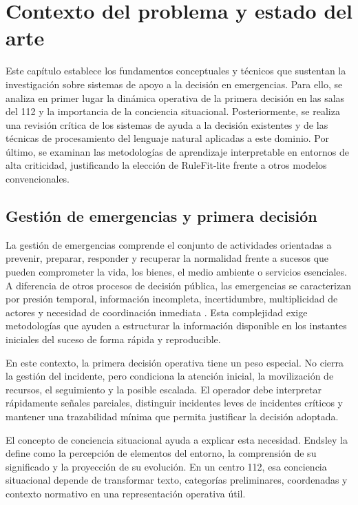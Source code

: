 \chapter{Contexto del problema y estado del arte}
\label{cap:2}

Este capítulo establece los fundamentos conceptuales y técnicos que sustentan la investigación sobre sistemas de apoyo a la decisión en emergencias. Para ello, se analiza en primer lugar la dinámica operativa de la primera decisión en las salas del 112 y la importancia de la conciencia situacional. Posteriormente, se realiza una revisión crítica de los sistemas de ayuda a la decisión existentes y de las técnicas de procesamiento del lenguaje natural aplicadas a este dominio. Por último, se examinan las metodologías de aprendizaje interpretable en entornos de alta criticidad, justificando la elección de RuleFit-lite frente a otros modelos convencionales.

\section{Gestión de emergencias y primera decisión}

La gestión de emergencias comprende el conjunto de actividades orientadas a prevenir, preparar, responder y recuperar la normalidad frente a sucesos que pueden comprometer la vida, los bienes, el medio ambiente o servicios esenciales. A diferencia de otros procesos de decisión pública, las emergencias se caracterizan por presión temporal, información incompleta, incertidumbre, multiplicidad de actores y necesidad de coordinación inmediata \cite{Quarantelli1988,Comfort2007}. Esta complejidad exige metodologías que ayuden a estructurar la información disponible en los instantes iniciales del suceso de forma rápida y reproducible.

En este contexto, la primera decisión operativa tiene un peso especial. No cierra la gestión del incidente, pero condiciona la atención inicial, la movilización de recursos, el seguimiento y la posible escalada. El operador debe interpretar rápidamente señales parciales, distinguir incidentes leves de incidentes críticos y mantener una trazabilidad mínima que permita justificar la decisión adoptada.

El concepto de conciencia situacional ayuda a explicar esta necesidad. Endsley \citeyear{Endsley1995} la define como la percepción de elementos del entorno, la comprensión de su significado y la proyección de su evolución. En un centro 112, esa conciencia situacional depende de transformar texto, categorías preliminares, coordenadas y contexto normativo en una representación operativa útil.

